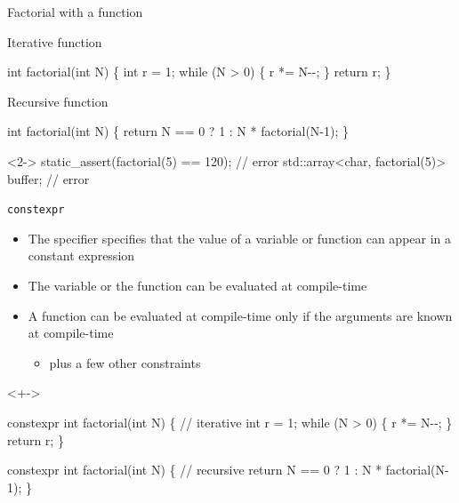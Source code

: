 \begin{frame}[fragile]{Factorial with a function}

  Iterative function

  \begin{codeblock}
int factorial(int N) \{
  int r = 1;
  while (N > 0) \{ r *= N-{}-; \}
  return r;
\}\end{codeblock}

Recursive function

\begin{codeblock}
int factorial(int N) \{
  return N == 0 ? 1 : N * factorial(N-1);
\}\end{codeblock}

\begin{codeblock}<2->{
static_assert(\alert<2>{factorial(5)} == 120);    // error
std::array<char, \alert<2>{factorial(5)}> buffer; // error}\end{codeblock}

\end{frame}
\begin{frame}[fragile]{\texttt{constexpr}}

  \begin{itemize}[<+->]
  \item The  specifier specifies that the value of a variable or
    function can appear in a constant expression
  \item The variable or the function can be evaluated at compile-time
  \item A function can be evaluated at compile-time only if the arguments are
    known at compile-time
    \begin{itemize}
    \item plus a few other constraints
    \end{itemize}
  \end{itemize}

  \begin{codeblock}<+->{
\alert{constexpr} int factorial(int N) \{ // iterative
  int r = 1;
  while (N > 0) \{ r *= N-{}-; \}
  return r;
\}

\alert{constexpr} int factorial(int N) \{ // recursive
  return N == 0 ? 1 : N * factorial(N-1);
\}

}\end{codeblock}
\end{frame}

